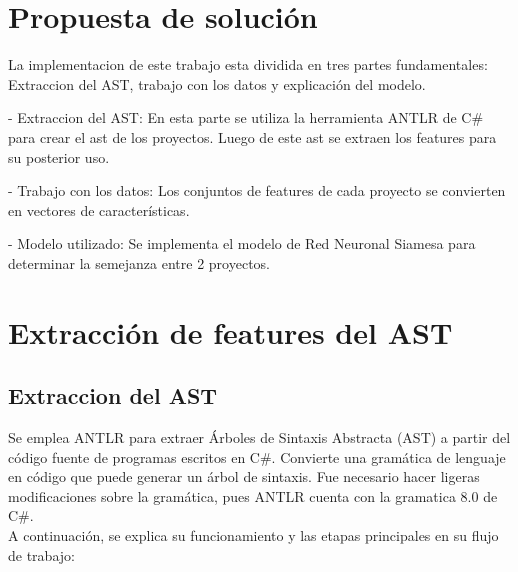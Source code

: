 \chapter{Propuesta de solución}\label{chapter:proposal}

La implementacion  de este trabajo esta dividida en tres partes fundamentales: Extraccion del AST, trabajo con los datos y explicación del modelo.

- Extraccion del AST: En esta parte se utiliza la herramienta ANTLR de C\# para crear el ast de los proyectos. Luego de este ast se extraen los features para su posterior uso.

- Trabajo con los datos: Los conjuntos de features de cada proyecto se convierten en vectores de características.

- Modelo utilizado: Se implementa el modelo de Red Neuronal Siamesa para determinar la semejanza entre 2 proyectos.

\chapter{Extracción de features del AST}\label{chapter:proposal}
\section{Extraccion del AST}

 Se emplea ANTLR para extraer Árboles de Sintaxis Abstracta (AST) a partir del código fuente de programas escritos en C\#. Convierte una gramática de lenguaje en código que puede generar un árbol de sintaxis. Fue necesario hacer ligeras modificaciones sobre la gramática, pues ANTLR cuenta con la gramatica 8.0 de C\#. \\
 A continuación, se explica su funcionamiento y las etapas principales en su flujo de trabajo:
 
